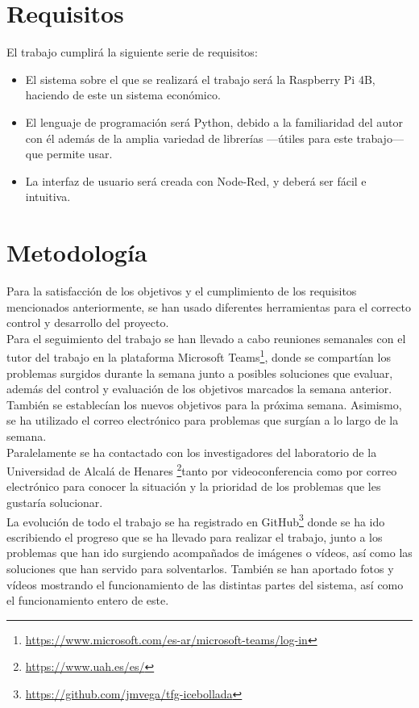 \section{Requisitos}
\label{sec:requisitos}
El trabajo cumplirá la siguiente serie de requisitos:
\begin{itemize}
 \item El sistema sobre el que se realizará el trabajo será la Raspberry Pi 4B, haciendo de este un sistema económico. 
 \item El lenguaje de programación será Python, debido a la familiaridad del autor con él además de la amplia variedad de librerías ---útiles para este trabajo--- que permite usar.
 \item La interfaz de usuario será creada con Node-Red, y deberá ser fácil e intuitiva.
\end{itemize}
\section{Metodología}
\label{sec:metodologia}
Para la satisfacción de los objetivos y el cumplimiento de los requisitos mencionados anteriormente, se han usado diferentes herramientas para el correcto control y desarrollo del proyecto.\\

Para el seguimiento del trabajo se han llevado a cabo reuniones semanales con el tutor del trabajo en la plataforma Microsoft Teams\footnote{\url{https://www.microsoft.com/es-ar/microsoft-teams/log-in}}, donde se compartían los problemas surgidos durante la semana junto a posibles soluciones que evaluar, además del control y evaluación de los objetivos marcados la semana anterior. También se establecían los nuevos objetivos para la próxima semana. Asimismo, se ha utilizado el correo electrónico para problemas que surgían a lo largo de la semana.\\
Paralelamente se ha contactado con los investigadores del laboratorio de la Universidad de Alcalá de Henares \footnote{\url{https://www.uah.es/es/}}tanto por videoconferencia como por correo electrónico para conocer la situación y la prioridad de los problemas que les gustaría solucionar.\\

La evolución de todo el trabajo se ha registrado en GitHub\footnote{\url{https://github.com/jmvega/tfg-icebollada}} donde se ha ido escribiendo el progreso que se ha llevado para realizar el trabajo, junto a los problemas que han ido surgiendo acompañados de imágenes o vídeos, así como las soluciones que han servido para solventarlos. También se han aportado fotos y vídeos mostrando el funcionamiento de las distintas partes del sistema, así como el funcionamiento entero de este.

